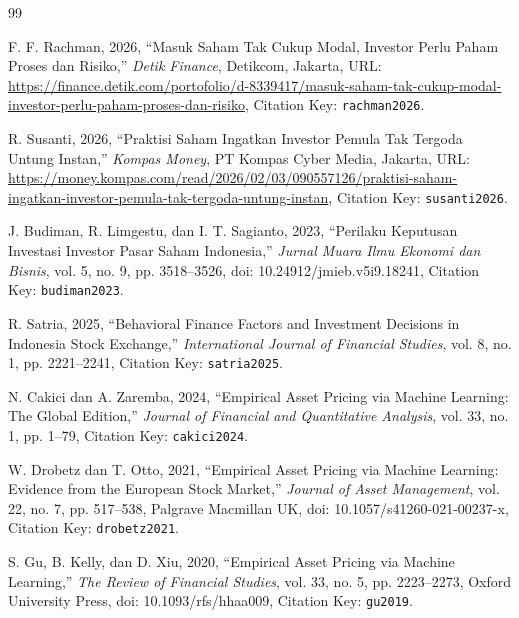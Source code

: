 \documentclass[10pt,a4paper]{article}
\begin{document}
\begingroup
\renewcommand{\section}[2]{}%
\begin{thebibliography}{99}
\fontsize{8pt}{9.8pt}\selectfont
\setlength{\itemsep}{0.5pt}
\setlength{\parskip}{0pt}

F. F. Rachman, 2026, ``Masuk Saham Tak Cukup Modal, Investor Perlu Paham Proses dan Risiko,'' \textit{Detik Finance}, Detikcom, Jakarta, URL: \url{https://finance.detik.com/portofolio/d-8339417/masuk-saham-tak-cukup-modal-investor-perlu-paham-proses-dan-risiko}, Citation Key: \texttt{rachman2026}.

R. Susanti, 2026, ``Praktisi Saham Ingatkan Investor Pemula Tak Tergoda Untung Instan,'' \textit{Kompas Money}, PT Kompas Cyber Media, Jakarta, URL: \url{https://money.kompas.com/read/2026/02/03/090557126/praktisi-saham-ingatkan-investor-pemula-tak-tergoda-untung-instan}, Citation Key: \texttt{susanti2026}.

J. Budiman, R. Limgestu, dan I. T. Sagianto, 2023, ``Perilaku Keputusan Investasi Investor Pasar Saham Indonesia,'' \textit{Jurnal Muara Ilmu Ekonomi dan Bisnis}, vol. 5, no. 9, pp. 3518--3526, doi: 10.24912/jmieb.v5i9.18241, Citation Key: \texttt{budiman2023}.

R. Satria, 2025, ``Behavioral Finance Factors and Investment Decisions in Indonesia Stock Exchange,'' \textit{International Journal of Financial Studies}, vol. 8, no. 1, pp. 2221--2241, Citation Key: \texttt{satria2025}.

N. Cakici dan A. Zaremba, 2024, ``Empirical Asset Pricing via Machine Learning: The Global Edition,'' \textit{Journal of Financial and Quantitative Analysis}, vol. 33, no. 1, pp. 1--79, Citation Key: \texttt{cakici2024}.

W. Drobetz dan T. Otto, 2021, ``Empirical Asset Pricing via Machine Learning: Evidence from the European Stock Market,'' \textit{Journal of Asset Management}, vol. 22, no. 7, pp. 517--538, Palgrave Macmillan UK, doi: 10.1057/s41260-021-00237-x, Citation Key: \texttt{drobetz2021}.

S. Gu, B. Kelly, dan D. Xiu, 2020, ``Empirical Asset Pricing via Machine Learning,'' \textit{The Review of Financial Studies}, vol. 33, no. 5, pp. 2223--2273, Oxford University Press, doi: 10.1093/rfs/hhaa009, Citation Key: \texttt{gu2019}.


\end{thebibliography}
\end{document}
